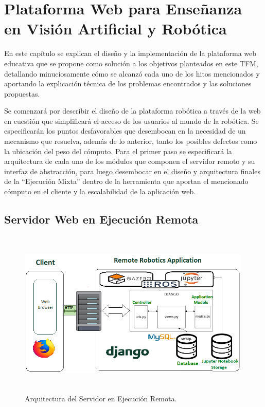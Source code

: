 \chapter{Plataforma Web para Enseñanza en Visión Artificial y Robótica}
En este capítulo se explican el diseño y la implementación de la plataforma web educativa que se propone como solución a los objetivos planteados en este TFM, detallando minuciosamente cómo se alcanzó cada uno de los hitos mencionados y aportando la explicación técnica de los problemas encontrados y las soluciones propuestas.

Se comenzará por describir el diseño de la plataforma robótica a través de la web en cuestión que simplificará el acceso de los usuarios al mundo de la robótica. Se especificarán los puntos desfavorables que desembocan en la necesidad de un mecanismo que resuelva, además de lo anterior, tanto los posibles defectos como la ubicación del peso del cómputo. Para el primer paso se especificará la arquitectura de cada uno de los módulos que componen el servidor remoto y su interfaz de abstracción, para luego desembocar en el diseño y arquitectura finales de la ``Ejecución Mixta'' dentro de la herramienta que aportan el mencionado cómputo en el cliente y la escalabilidad de la aplicación web.

\section{Servidor Web en Ejecución Remota}

\begin{figure}[!ht]  \centering\noindent
    \includegraphics[width=0.99\textwidth,height=8cm]{figures/servidor_remoto_arquitectura.png}
    \caption{Arquitectura del Servidor en Ejecución Remota.}
    \label{remoteexecarch}
\end{figure}

